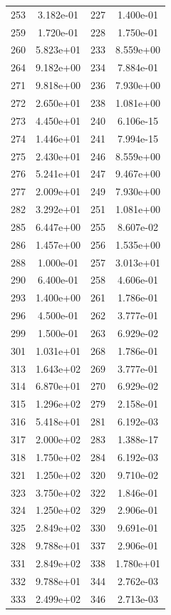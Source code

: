 \documentclass[12pt]{article}
\begin{document}
\begin{longtable}{@{}cccc@{}}
253 & 3.182e-01 & 227 & 1.400e-01 \\
259 & 1.720e-01 & 228 & 1.750e-01 \\
260 & 5.823e+01 & 233 & 8.559e+00 \\
264 & 9.182e+00 & 234 & 7.884e-01 \\
271 & 9.818e+00 & 236 & 7.930e+00 \\
272 & 2.650e+01 & 238 & 1.081e+00 \\
273 & 4.450e+01 & 240 & 6.106e-15 \\
274 & 1.446e+01 & 241 & 7.994e-15 \\
275 & 2.430e+01 & 246 & 8.559e+00 \\
276 & 5.241e+01 & 247 & 9.467e+00 \\
277 & 2.009e+01 & 249 & 7.930e+00 \\
282 & 3.292e+01 & 251 & 1.081e+00 \\
285 & 6.447e+00 & 255 & 8.607e-02 \\
286 & 1.457e+00 & 256 & 1.535e+00 \\
288 & 1.000e-01 & 257 & 3.013e+01 \\
290 & 6.400e-01 & 258 & 4.606e-01 \\
293 & 1.400e+00 & 261 & 1.786e-01 \\
296 & 4.500e-01 & 262 & 3.777e-01 \\
299 & 1.500e-01 & 263 & 6.929e-02 \\
301 & 1.031e+01 & 268 & 1.786e-01 \\
313 & 1.643e+02 & 269 & 3.777e-01 \\
314 & 6.870e+01 & 270 & 6.929e-02 \\
315 & 1.296e+02 & 279 & 2.158e-01 \\
316 & 5.418e+01 & 281 & 6.192e-03 \\
317 & 2.000e+02 & 283 & 1.388e-17 \\
318 & 1.750e+02 & 284 & 6.192e-03 \\
321 & 1.250e+02 & 320 & 9.710e-02 \\
323 & 3.750e+02 & 322 & 1.846e-01 \\
324 & 1.250e+02 & 329 & 2.906e-01 \\
325 & 2.849e+02 & 330 & 9.691e-01 \\
328 & 9.788e+01 & 337 & 2.906e-01 \\
331 & 2.849e+02 & 338 & 1.780e+01 \\
332 & 9.788e+01 & 344 & 2.762e-03 \\
333 & 2.499e+02 & 346 & 2.713e-03 \\

\end{longtable}
\end{document}
